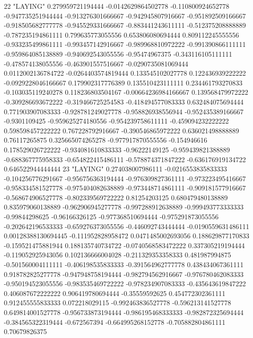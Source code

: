 22 "LAYING" 0.279959721194444 -0.0142629864502778 -0.110800924652778 -0.947735251944444 -0.913276301666667 -0.942945807916667 -0.951892509166667 -0.918505682777778 -0.945529331666667 -0.883441243611111 -0.512375208888889 -0.787235194861111 0.799635773055556 0.653806080694444 0.809112245555556 -0.933235499861111 -0.993457142916667 -0.989968810972222 -0.991390866111111 -0.959864085138889 -0.940692543055556 -0.95474967375 -0.343116105111111 -0.478574138055556 -0.463901557516667 -0.0290735081069444 0.0112002136784722 -0.0264403574819444 0.133545102027778 0.122436939222222 -0.0929228046166667 0.179902317776389 0.135510423111111 0.234461793270833 -0.103035119240278 0.118236803504167 -0.00664236984166667 0.139568479972222 -0.309286693672222 -0.319466725254583 -0.418494577083333 0.632484075694444 0.771903907083333 -0.928781249027778 -0.958826938556944 -0.952435389166667 -0.9301109425 -0.959625274180556 -0.954239758611111 -0.459094232222222 0.598598457222222 0.767228792916667 -0.390546865972222 0.636021498888889 0.76117265875 0.325665074265278 -0.977917870555556 -0.154946616 0.178529026722222 -0.934081610833333 -0.96222149125 -0.959439821388889 -0.688367775958333 -0.654822415486111 -0.578874371847222 -0.636176919134722 0.646522944444444
23 "LAYING" 0.274038007986111 -0.0216553835833333 -0.104256776291667 -0.956756363194444 -0.976309827361111 -0.973223495416667 -0.958334581527778 -0.975404082638889 -0.973448714861111 -0.909181577916667 -0.568674906527778 -0.802339569722222 0.81254203125 0.680479480138889 0.835979060138889 -0.962906945277778 -0.997288912638889 -0.999493773333333 -0.99844298625 -0.96166326125 -0.977368510694444 -0.975291873055556 -0.202642196533333 -0.659276373055556 -0.446092743444444 -0.0190559631486111 0.00128388130694445 -0.111952828958472 0.0471485002693056 0.188629877170833 -0.159521475881944 0.188135740734722 -0.0740568583472222 0.337305219194444 -0.119052925943056 0.102136666004028 -0.211329353358333 0.481987994875 -0.501560004111111 -0.406198535833333 -0.391564962777778 0.438434067361111 0.918782825277778 -0.947948758194444 -0.982794562916667 -0.976780462083333 -0.950194523055556 -0.983535469722222 -0.978234907083333 -0.435643619847222 0.406087672222222 0.906419780694444 -0.35559592625 0.454772302361111 0.912455555833333 0.072218029115 -0.992463836527778 -0.596213141527778 0.649814001527778 -0.956733873194444 -0.986195468333333 -0.982872325694444 -0.384565322319444 -0.672567394 -0.664995268152778 -0.705882804861111 0.70679826375
